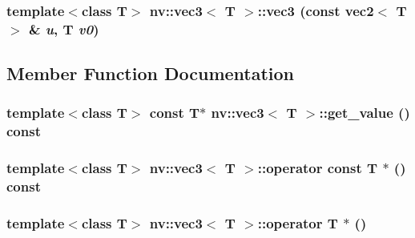 \hypertarget{classnv_1_1vec3_b3f0294e4bb187d4a1d1ca0d56a859b4}{
\subsubsection[{vec3}]{\setlength{\rightskip}{0pt plus 5cm}template$<$class T$>$ {\bf nv::vec3}$<$ T $>$::{\bf vec3} (const {\bf vec2}$<$ T $>$ \& {\em u}, \/  T {\em v0})}}
\label{classnv_1_1vec3_b3f0294e4bb187d4a1d1ca0d56a859b4}




\subsection{Member Function Documentation}
\hypertarget{classnv_1_1vec3_91339ecb6269c602df94ae275ab538e2}{
\subsubsection[{get\_\-value}]{\setlength{\rightskip}{0pt plus 5cm}template$<$class T$>$ const T$\ast$ {\bf nv::vec3}$<$ T $>$::get\_\-value () const}}
\label{classnv_1_1vec3_91339ecb6269c602df94ae275ab538e2}


\hypertarget{classnv_1_1vec3_6f3cd16898b03899397de070de2f0e6f}{
\subsubsection[{operator const T $\ast$}]{\setlength{\rightskip}{0pt plus 5cm}template$<$class T$>$ {\bf nv::vec3}$<$ T $>$::operator const T $\ast$ () const}}
\label{classnv_1_1vec3_6f3cd16898b03899397de070de2f0e6f}


\hypertarget{classnv_1_1vec3_811a2dd63d6a16dc913871be23285485}{
\subsubsection[{operator T $\ast$}]{\setlength{\rightskip}{0pt plus 5cm}template$<$class T$>$ {\bf nv::vec3}$<$ T $>$::operator T $\ast$ ()}}
\label{classnv_1_1vec3_811a2dd63d6a16dc913871be23285485}


